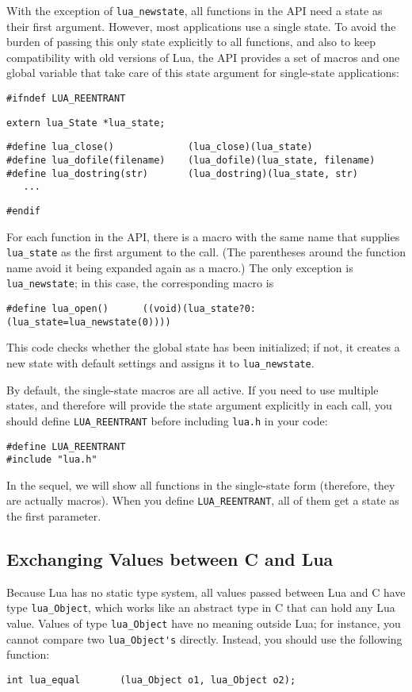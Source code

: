 \documentclass[11pt]{article}
\newcommand{\T}[1]{{\tt #1}}
\newcommand{\IndexVerb}[1]{\T{#1}\index{#1}}
\newcommand{\Deffunc}[1]{\index{#1}}
\begin{document}
With the exception of \verb|lua_newstate|,
all functions in the API need a state as their first argument.
However, most applications use a single state.
To avoid the burden of passing this only state explicitly to all
functions, and also to keep compatibility with old versions of Lua,
the API provides a set of macros and one global variable that
take care of this state argument for single-state applications:
\begin{verbatim}
#ifndef LUA_REENTRANT
\end{verbatim}
\begin{verbatim}
extern lua_State *lua_state;
\end{verbatim}
\begin{verbatim}
#define lua_close()             (lua_close)(lua_state)
#define lua_dofile(filename)    (lua_dofile)(lua_state, filename)
#define lua_dostring(str)       (lua_dostring)(lua_state, str)
   ...
\end{verbatim}
\begin{verbatim}
#endif
\end{verbatim}
For each function in the API, there is a macro with the same name
that supplies \verb|lua_state| as the first argument to the call.
(The parentheses around the function name avoid it being expanded
again as a macro.)
The only exception is \verb|lua_newstate|;
in this case, the corresponding macro is
\begin{verbatim}
#define lua_open()      ((void)(lua_state?0:(lua_state=lua_newstate(0))))
\end{verbatim}
This code checks whether the global state has been initialized;
if not, it creates a new state with default settings and
assigns it to \verb|lua_newstate|.

By default, the single-state macros are all active.
If you need to use multiple states,
and therefore will provide the state argument explicitly in each call,
you should define \IndexVerb{LUA_REENTRANT} before
including \verb|lua.h| in your code:
\begin{verbatim}
#define LUA_REENTRANT
#include "lua.h"
\end{verbatim}

In the sequel, we will show all functions in the single-state form
(therefore, they are actually macros).
When you define \verb|LUA_REENTRANT|,
all of them get a state as the first parameter.


\subsection{Exchanging Values between C and Lua} \label{valuesCLua}
Because Lua has no static type system,
all values passed between Lua and C have type
\verb|lua_Object|\Deffunc{lua_Object},
which works like an abstract type in C that can hold any Lua value.
Values of type \verb|lua_Object| have no meaning outside Lua;
for instance,
you cannot compare two \verb|lua_Object's| directly.
Instead, you should use the following function:
\Deffunc{lua_equal}
\begin{verbatim}
int lua_equal       (lua_Object o1, lua_Object o2);
\end{verbatim}
\end{document}
